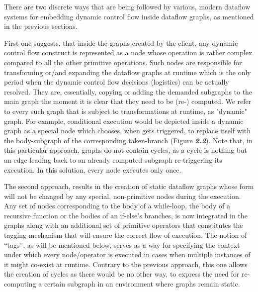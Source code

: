 \documentclass[ack,preface]{dithesis}
\begin{document}
There are two discrete ways that are being followed by various, modern dataflow systems for embedding dynamic control flow inside dataflow graphs, as mentioned in the previous sections. 

First one suggests, that inside the graphs created by the client, any dynamic control flow construct is represented as a node whose operation is rather complex compared to all the other primitive operations. Such nodes are responsible for transforming or/and expanding the dataflow graphs at runtime which is the only period when the dynamic control flow decisions (logistics) can be actually resolved. They are, essentially, copying or adding the demanded subgraphs to the main graph the moment it is clear that they need to be (re-) computed. We refer to every such graph that is subject to transformations at runtime, as "dynamic" graph.  For example, conditional execution would be depicted inside a dynamic graph as a special node which chooses, when gets triggered, to replace itself with the body-subgraph of the corresponding taken-branch (Figure \textit{\textbf{2.2}}).
Note that, in this particular approach, graphs do not contain cycles, as a cycle is nothing but an edge leading back to an already computed subgraph re-triggering its execution. In this solution, every node executes only once. 

The second approach, results in the creation of static dataflow graphs whose form will not be changed by any special, non-primitive nodes during the execution. Any set of nodes corresponding to the body of a while-loop, the body of a recursive function or the bodies of an if-else’s branches, is now integrated in the graphs along with an additional set of primitive operators that constitutes the tagging mechanism that will ensure the correct flow of execution. The notion of “tags”, as will be mentioned below, serves as a way for specifying the context under which every node/operator is executed in cases when multiple instances of it might co-exist at runtime. Contrary to the previous approach, this one allows the creation of cycles as there would be no other way, to express the need for re-computing a certain subgraph in an environment where graphs remain static. 
\end{document}
